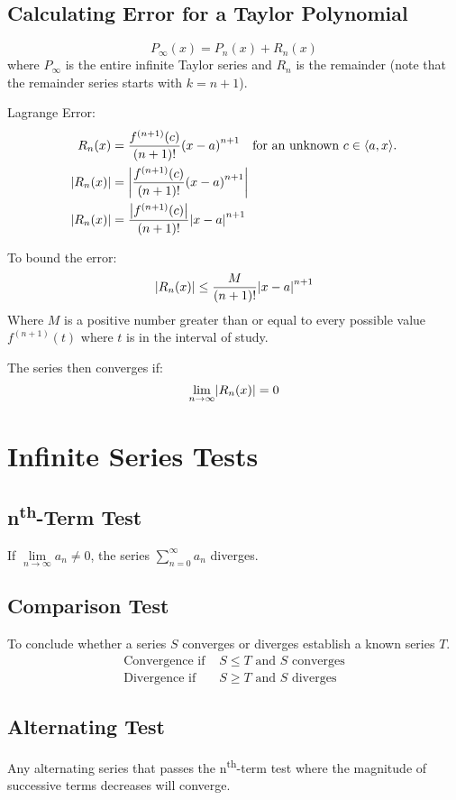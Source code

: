 \documentclass[12pt]{article}
\DeclarePairedDelimiter\abs{\lvert}{\rvert}
\newcommand*{\isum}[1]{\sum\limits_{#1}^\infty}
\newcommand*{\fixmath}{%
  \makebox{}\vspace{\glueexpr-\baselineskip-\abovedisplayskip}}
\newenvironment{fixaskip}{\setlength{\abovedisplayskip}{0pt}\fixmath%
  \ignorespaces}{\ignorespacesafterend}
\newenvironment{fixbskip}{\setlength{\belowdisplayskip}{0pt}\ignorespaces}%
  {\ignorespacesafterend}
\begin{document}
\subsection*{Calculating Error for a Taylor Polynomial}
\begin{fixaskip}
  \[
    P_\infty(x) = P_n(x) + R_n(x)
  \]
\end{fixaskip}
where \(P_\infty\) is the entire infinite Taylor series and \(R_n\) is the
remainder (note that the remainder series starts with \(k=n+1\)).

Lagrange Error:
\begin{align*}
  R_n(x) &= \frac{f^{(n+1)}(c)}{(n+1)!}{(x-a)}^{n+1}
    \quad\text{for an unknown \(c \in \left<a,x\right>\).}\\
  \abs*{R_n(x)} &= \abs*{\frac{f^{(n+1)}(c)}{(n+1)!}{(x-a)}^{n+1}}\\
  \abs*{R_n(x)} &= \frac{\abs*{f^{(n+1)}(c)}}{(n+1)!}\abs*{x-a}^{n+1}
\end{align*}


To bound the error:
\[
  \abs*{R_n(x)} \le \frac{M}{(n+1)!}\abs*{x-a}^{n+1}
\]
Where \(M\) is a positive number greater than or equal to every possible value
\(f^{(n+1)}(t)\) where \(t\) is in the interval of study.

The series then converges if:
\[
  \lim_{n \to \infty} \abs*{R_n(x)} = 0
\]
\section*{Infinite Series Tests}
\subsection*{n\textsuperscript{th}-Term Test}
If \(\lim\limits_{n \to \infty} a_n \ne 0\), the series
\(\isum{n=0}a_n\) diverges.
\subsection*{Comparison Test}
To conclude whether a series \(S\) converges or diverges establish a known
series \(T\).
\begin{fixbskip}
  \begin{align*}
    \text{Convergence if } &S \le T \text{ and } S \text { converges}\\
    \text{Divergence if } &S \ge T \text{ and } S \text { diverges}
  \end{align*}
\end{fixbskip}
\subsection*{Alternating Test}
Any alternating series that passes the n\textsuperscript{th}-term test where
the magnitude of successive terms decreases will converge.
\end{document}
